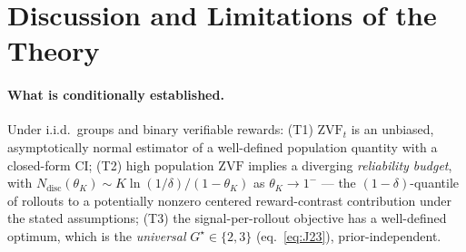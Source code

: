 \documentclass[11pt]{article}
\theoremstyle{plain}
\theoremstyle{definition}
\theoremstyle{remark}
\newcommand{\ZVF}{\ensuremath{\mathrm{ZVF}}}
\newcommand{\1}{\mathbb{1}}
\begin{document}
\section{Discussion and Limitations of the Theory}\label{sec:discussion}
\paragraph{What is conditionally established.} Under i.i.d.\ groups and binary
verifiable rewards: (T1) $\ZVF_t$ is an unbiased, asymptotically normal
estimator of a well-defined population quantity with a closed-form CI; (T2)
high population \ZVF{} implies a diverging \emph{reliability budget},
with $N_{\mathrm{disc}}(\theta_K)\sim K\ln(1/\delta)/(1-\theta_K)$ as
$\theta_K\to1^-$ --- the $(1{-}\delta)$-quantile of rollouts to a potentially nonzero centered
reward-contrast contribution under the stated assumptions; (T3) the
signal-per-rollout objective has a well-defined optimum, which is the
\emph{universal} $G^\star\in\{2,3\}$ (eq.~\ref{eq:J23}), prior-independent.
\end{document}
